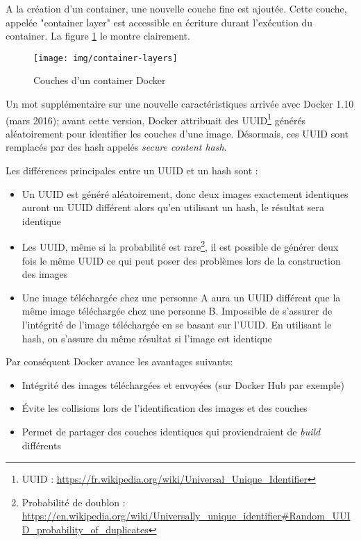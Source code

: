 A la création d'un container, une nouvelle couche fine est ajoutée. Cette couche, appelée "container layer" est accessible en écriture durant l'exécution du container. La figure \ref{docker-container-layers} le montre clairement.

\begin{figure}[hbtp]
\centering
\texttt{[image: img/container-layers]}
\caption{Couches d'un container Docker}
\label{docker-container-layers}
\end{figure}

Un mot supplémentaire sur une nouvelle caractéristiques arrivée avec Docker 1.10 (mars 2016); avant cette version, Docker attribuait des UUID\footnote{UUID : \url{https://fr.wikipedia.org/wiki/Universal_Unique_Identifier}} générés aléatoirement pour identifier les couches d'une image. Désormais, ces UUID sont remplacés par des hash appelés \textit{secure content hash}.

Les différences principales entre un UUID et un hash sont :
\begin{itemize}
\item Un UUID est généré aléatoirement, donc deux images exactement identiques auront un UUID différent alors qu'en utilisant un hash, le résultat sera identique
\item Les UUID, même si la probabilité est rare\footnote{Probabilité de doublon : \url{https://en.wikipedia.org/wiki/Universally_unique_identifier\#Random_UUID_probability_of_duplicates}}, il est possible de générer deux fois le même UUID ce qui peut poser des problèmes lors de la construction des images
\item Une image téléchargée chez une personne A aura un UUID différent que la même image téléchargée chez une personne B. Impossible de s'assurer de l'intégrité de l'image téléchargée en se basant sur l'UUID. En utilisant le hash, on s'assure du même résultat si l'image est identique
\end{itemize}

Par conséquent Docker avance les avantages suivants:
\begin{itemize}
\item Intégrité des images téléchargées et envoyées (sur Docker Hub par exemple)
\item Évite les collisions lors de l'identification des images et des couches
\item Permet de partager des couches identiques qui proviendraient de \textit{build} différents
\end{itemize}

